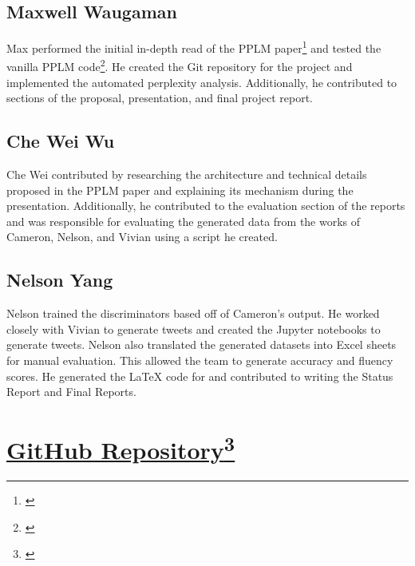 \documentclass[11pt]{article}
\begin{document}
\subsection{Maxwell Waugaman}
Max performed the initial in-depth read of the PPLM paper\footnote{\citep{pplm-paper}} and tested the vanilla PPLM code\footnote{\citep{pplm-git}}. He created the Git repository for the project and implemented the automated perplexity analysis. Additionally, he contributed to sections of the proposal, presentation, and final project report.

\subsection{Che Wei Wu}
Che Wei contributed by researching the architecture and technical details proposed in the PPLM paper and explaining its mechanism during the presentation. Additionally, he contributed to the evaluation section of the reports and was responsible for evaluating the generated data from the works of Cameron, Nelson, and Vivian using a script he created.

\subsection{Nelson Yang}
Nelson trained the discriminators based off of Cameron's output.  He worked closely with Vivian to generate tweets and created the Jupyter notebooks to generate tweets.  Nelson also translated the generated datasets into Excel sheets for manual evaluation.  This allowed the team to generate accuracy and fluency scores. He generated the LaTeX code for and contributed to writing the Status Report and Final Reports.  

\section{\href{https://github.com/MWaug/pplm-cs544-sentitweet}{GitHub Repository}\footnote{\citep{our-code}}}



\end{document}
